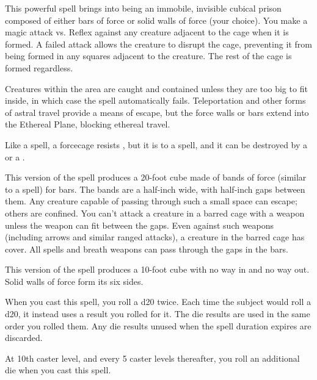 \spellrng{\rngmed}
\begin{spelleffect}
  This powerful spell brings into being an immobile, invisible cubical prison composed of either bars of force or solid walls of force (your choice). You make a magic attack vs. Reflex against any creature adjacent to the cage when it is formed. A failed attack allows the creature to disrupt the cage, preventing it from being formed in any squares adjacent to the creature. The rest of the cage is formed regardless.
  \par Creatures within the area are caught and contained unless they are too big to fit inside, in which case the spell automatically fails. Teleportation and other forms of astral travel provide a means of escape, but the force walls or bars extend into the Ethereal Plane, blocking ethereal travel.
  \par Like a  spell, a forcecage resists , but it is \vulnerable to a  spell, and it can be destroyed by a  or a .
  \par {} This version of the spell produces a 20-foot cube made of bands of force (similar to a  spell) for bars. The bands are a half-inch wide, with half-inch gaps between them. Any creature capable of passing through such a small space can escape; others are confined. You can't attack a creature in a barred cage with a weapon unless the weapon can fit between the gaps. Even against such weapons (including arrows and similar ranged attacks), a creature in the barred cage has cover. All spells and breath weapons can pass through the gaps in the bars.
  \par {} This version of the spell produces a 10-foot cube with no way in and no way out. Solid walls of force form its six sides.
\end{spelleffect}

\spellrng{\rngmed}
\spelldur{\durshort}
\begin{spelleffect}
    When you cast this spell, you roll a d20 twice. Each time the subject would roll a d20, it instead uses a result you rolled for it. The die results are used in the same order you rolled them. Any die results unused when the spell duration expires are discarded.

    At 10th caster level, and every 5 caster levels thereafter, you roll an additional die when you cast this spell.
\end{spelleffect}


